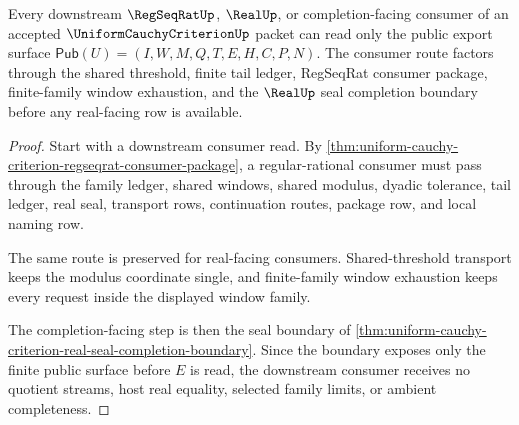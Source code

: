 \begin{theorem}
\label{thm:uniform-cauchy-criterion-downstream-real-consumer-export}
Every downstream $\RegSeqRatUp$, $\RealUp$, or completion-facing consumer of an accepted $\UniformCauchyCriterionUp$ packet can read only the public export surface $\mathsf{Pub}(U)=(I,W,M,Q,T,E,H,C,P,N)$. The consumer route factors through the shared threshold, finite tail ledger, RegSeqRat consumer package, finite-family window exhaustion, and the $\RealUp$ seal completion boundary before any real-facing row is available.
\end{theorem}
\begin{proof}
Start with a downstream consumer read. By \autoref{thm:uniform-cauchy-criterion-regseqrat-consumer-package}, a regular-rational consumer must pass through the family ledger, shared windows, shared modulus, dyadic tolerance, tail ledger, real seal, transport rows, continuation routes, package row, and local naming row.

The same route is preserved for real-facing consumers. Shared-threshold transport keeps the modulus coordinate single, and finite-family window exhaustion keeps every request inside the displayed window family.

The completion-facing step is then the seal boundary of \autoref{thm:uniform-cauchy-criterion-real-seal-completion-boundary}. Since the boundary exposes only the finite public surface before $E$ is read, the downstream consumer receives no quotient streams, host real equality, selected family limits, or ambient completeness.
\end{proof}

